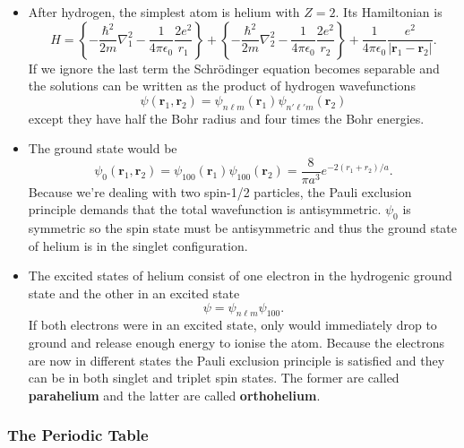 \documentclass{article}
\renewcommand{\vec}[1]{\boldsymbol{\mathbf{#1}}}
\begin{document}
\begin{itemize}
  \item After hydrogen, the simplest atom is helium with $Z = 2$. Its Hamiltonian is \[\hat{H} = \left\{ -\frac{\hbar^2}{2 m} \nabla_1^2 - \frac{1}{4 \pi \epsilon_0} \frac{2 e^2}{r_1} \right\} + \left\{ -\frac{\hbar^2}{2 m} \nabla_2^2 - \frac{1}{4 \pi \epsilon_0} \frac{2 e^2}{r_2} \right\} + \frac{1}{4 \pi \epsilon_0} \frac{e^2}{|\vec{r}_1 - \vec{r}_2|}.\] If we ignore the last term the Schrödinger equation becomes separable and the solutions can be written as the product of hydrogen wavefunctions \[\psi(\vec{r}_1, \vec{r}_2) = \psi_{n \ell m}(\vec{r}_1) \psi_{n' \ell' m}(\vec{r}_2)\] except they have half the Bohr radius and four times the Bohr energies.

  \item The ground state would be \[\psi_0(\vec{r}_1, \vec{r}_2) = \psi_{1 0 0}(\vec{r}_1) \psi_{1 0 0}(\vec{r}_2) = \frac{8}{\pi a^3} e^{-2 (r_1 + r_2) / a}.\] Because we're dealing with two spin-1/2 particles, the Pauli exclusion principle demands that the total wavefunction is antisymmetric. $\psi_0$ is symmetric so the spin state must be antisymmetric and thus the ground state of helium is in the singlet configuration.

  \item The excited states of helium consist of one electron in the hydrogenic ground state and the other in an excited state \[\psi = \psi_{n \ell m} \psi_{1 0 0}.\] If both electrons were in an excited state, only would immediately drop to ground and release enough energy to ionise the atom. Because the electrons are now in different states the Pauli exclusion principle is satisfied and they can be in both singlet and triplet spin states. The former are called \textbf{parahelium} and the latter are called \textbf{orthohelium}.
\end{itemize}

\subsubsection{The Periodic Table}
\end{document}
